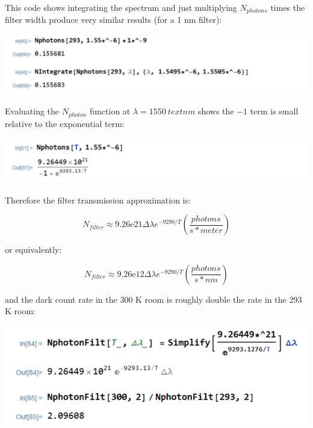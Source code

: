 \documentclass[12pt]{caltech_thesis}
\begin{document}
\begin{enumerate}
{  }

  {\color{midnightblue} This code shows integrating the spectrum and
  just multiplying \(N_{photons}\) times the filter width produce very
  similar results (for a 1 nm filter):}

  {\color{midnightblue} \includegraphics{chapter_05/figs_05/nphoton_approx.PNG}}

  {\color{midnightblue} Evaluating the \(N_{photon}\) function at
  \(\lambda = 1550~text{nm}\) shows the \(-1\) term is small relative to
  the exponential term:}

  {\color{midnightblue} \includegraphics{chapter_05/figs_05/small_relative_to_exponential.PNG}}

  {\color{midnightblue} Therefore the filter transmission approximation
  is:}

  {\color{midnightblue} 

  \[\boxed{N_{filter} \approx 9.26\mathrm{e}21 \Delta\lambda e^{-9290/T} (\frac{photons}{s*meter})}\]

  }

  {\color{midnightblue} or equivalently: }

  {\color{midnightblue} 

  \[\boxed{N_{filter} \approx 9.26\mathrm{e}12 \Delta\lambda e^{-9290/T} (\frac{photons}{s*nm})}\]

  }

  {\color{midnightblue} and the dark count rate in the 300 K room is
  roughly double the rate in the 293 K room: }

  {\color{midnightblue} \includegraphics{chapter_05/figs_05/filter_with_temp.PNG}}


\end{enumerate}
\end{document}
